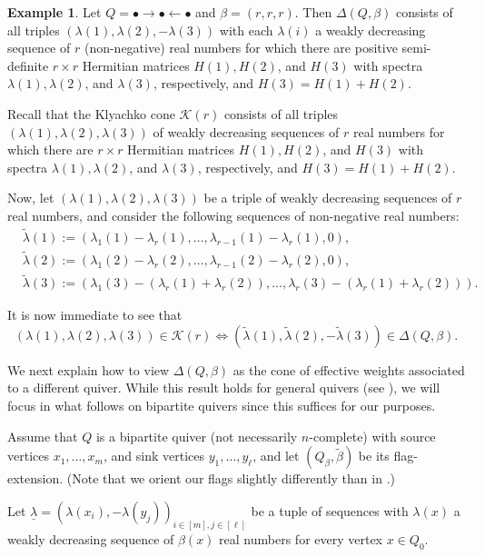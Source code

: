 \documentclass[11pt]{article}
\theoremstyle{definition}
\newtheorem{exam}[theo]{Example}
\numberwithin{equation}{section}
\newcommand{\K}{\mathcal{K}}
\begin{document}
\begin{exam}\label{Kly-cone-ex} Let $Q=\bullet \rightarrow \bullet \leftarrow \bullet$ and $\beta =(r,r,r)$. Then $\Delta(Q, \beta)$ consists of all triples $(\lambda(1), \lambda(2), -\lambda(3))$ with each $\lambda(i)$ a weakly decreasing sequence of $r$ (non-negative) real numbers for which there are positive semi-definite $r \times r$ Hermitian matrices $H(1), H(2)$, and $ H(3)$ with spectra $\lambda(1), \lambda(2)$,  and $\lambda(3)$, respectively, and $H(3)=H(1)+H(2)$.

Recall that the Klyachko cone $\K(r)$ consists of all triples $(\lambda(1), \lambda(2), \lambda(3))$ of weakly decreasing sequences of $r$ real numbers for which there are $r \times r$ Hermitian matrices $H(1), H(2)$, and $ H(3)$ with spectra $\lambda(1), \lambda(2)$,  and $\lambda(3)$, respectively, and $H(3)=H(1)+H(2)$.

Now, let $(\lambda(1), \lambda(2), \lambda(3))$ be a triple of weakly decreasing sequences of $r$ real numbers, and consider the following sequences of non-negative real numbers:
\begin{align*}
&\widetilde{\lambda}(1):=(\lambda_1(1)-\lambda_r(1), \ldots, \lambda_{r-1}(1)-\lambda_r(1), 0),\\
& \widetilde{\lambda}(2):=(\lambda_1(2)-\lambda_r(2), \ldots, \lambda_{r-1}(2)-\lambda_r(2), 0), \\
&\widetilde{\lambda}(3):=(\lambda_1(3)-(\lambda_r(1)+\lambda_r(2)), \ldots, \lambda_r(3)-(\lambda_r(1)+\lambda_r(2))).
\end{align*}

It is now immediate to see that
$$
(\lambda(1), \lambda(2), \lambda(3)) \in \K(r) \Longleftrightarrow (\widetilde{\lambda}(1), \widetilde{\lambda}(2),-\widetilde{\lambda}(3)) \in \Delta(Q, \beta).
$$
\end{exam}

We next explain how to view $\Delta(Q,\beta)$ as the cone of effective weights associated to a different quiver. While this result holds for general quivers (see \cite{Ber-Rei-2022}), we will focus in what follows on bipartite quivers since this suffices for our purposes. 

Assume that $Q$ is a bipartite quiver (not necessarily $n$-complete) with source vertices $x_1, \ldots, x_m$, and sink vertices $y_1, \ldots, y_\ell$, and let $(Q_\beta, \widetilde{\beta})$ be its flag-extension. (Note that we orient our flags slightly differently than in \cite{Ber-Rei-2022}.) 

Let $\underline{\lambda} = (\lambda(x_i), -\lambda(y_j))_{i \in [m], j \in [\ell]}$ be a tuple of sequences with $\lambda(x)$ a weakly decreasing sequence of $\beta(x)$ real numbers for every vertex $x \in Q_0$.  
\end{document}
